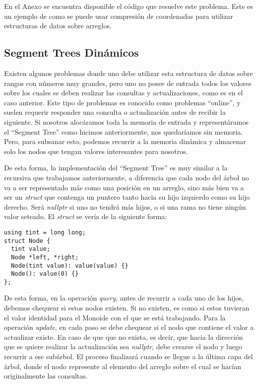 \documentclass{article}
\begin{document}
En el Anexo se encuentra disponible el código que resuelve este problema. Este es un ejemplo de como se puede usar compresión de coordenadas para utilizar estructuras de datos sobre arreglos.

\subsection{Segment Trees Dinámicos}

Existen algunos problemas donde uno debe utilizar esta estructura de datos sobre rangos con números muy grandes, pero uno no posee de entrada todos los valores sobre los cuales se deben realizar las consultas y actualizaciones, como es en el caso anterior. Este tipo de problemas es conocido como problemas ``online'', y suelen requerir responder una consulta o actualización antes de recibir la siguiente. Si nosotros alocáramos toda la memoria de entrada y representáramos el ``Segment Tree'' como hicimos anteriormente, nos quedaríamos sin memoria. Pero, para subsanar esto, podemos recurrir a la memoria dinámica y almacenar solo los nodos que tengan valores interesantes para nosotros.

De esta forma, la implementación del ``Segment Tree'' es muy similar a la recursiva que trabajamos anteriormente, a diferencia que cada nodo del árbol no va a ser representado más como una posición en un arreglo, sino más bien va a ser un \textit{struct} que contenga un puntero tanto hacia su hijo izquierdo como su hijo derecho. Será \textit{nullptr} si uno no tendrá más hijos, o si una rama no tiene ningún valor seteado. El \textit{struct} se vería de la siguiente forma:

\begin{verbatim}
using tint = long long;
struct Node {
  tint value;
  Node *left, *right;
  Node(tint value): value(value) {}
  Node(): value(0) {}
};
\end{verbatim}

De esta forma, en la operación \textit{query}, antes de recurrir a cada uno de los hijos, debemos chequear si estos nodos existen. Si no existen, es como si estos tuvieran el valor identidad para el Monoide con el que se está trabajando. Para la operación \textit{update}, en cada paso se debe chequear si el nodo que contiene el valor a actualizar existe. En caso de que que no exista, es decir, que hacia la dirección que se quiere realizar la actualización sea \textit{nullptr}, debe crearse el nodo y luego recurrir a ese subárbol. El proceso finalizará cuando se llegue a la última capa del árbol, donde el nodo represente al elemento del arreglo sobre el cual se hacían originalmente las consultas.
\end{document}
